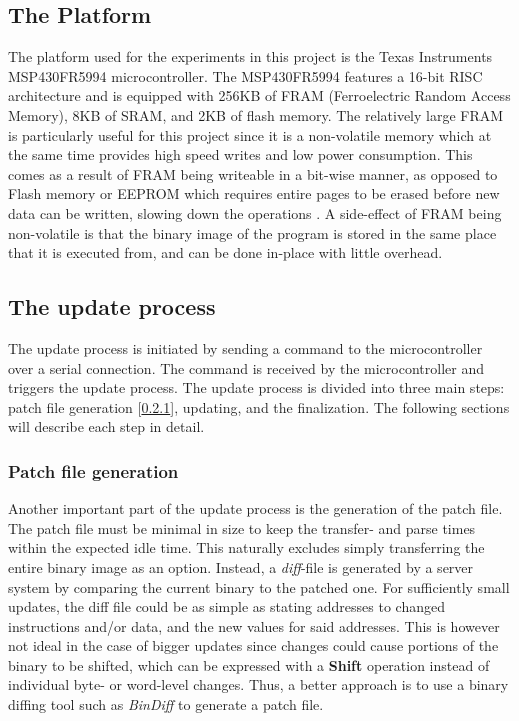 \subsection{The Platform}
The platform used for the experiments in this project is the Texas Instruments MSP430FR5994 microcontroller. The MSP430FR5994 features a 16-bit RISC architecture and is equipped with 256KB of FRAM (Ferroelectric Random Access Memory), 8KB of SRAM, and 2KB of flash memory. The relatively large FRAM is particularly useful for this project since it is a non-volatile memory which at the same time provides high speed writes and low power consumption. This comes as a result of FRAM being writeable in a bit-wise manner, as opposed to Flash memory or EEPROM which requires entire pages to be erased before new data can be written, slowing down the operations \cite{framReport}. A side-effect of FRAM being non-volatile is that the binary image of the program is stored in the same place that it is executed from, and can be done in-place with little overhead. 

\subsection{The update process}
The update process is initiated by sending a command to the microcontroller over a serial connection. The command is received by the microcontroller and triggers the update process. The update process is divided into three main steps: patch file generation [\ref{sec:patchfile}], updating, and the finalization. The following sections will describe each step in detail.

\subsubsection{Patch file generation}\label{sec:patchfile}
Another important part of the update process is the generation of the patch file. The patch file must be minimal in size to keep the transfer- and parse times within the expected idle time. This naturally excludes simply transferring the entire binary image as an option. Instead, a \textit{diff}-file is generated by a server system by comparing the current binary to the patched one. For sufficiently small updates, the diff file could be as simple as stating addresses to changed instructions and/or data, and the new values for said addresses. This is however not ideal in the case of bigger updates since changes could cause portions of the binary to be shifted, which can be expressed with a \textbf{Shift} operation instead of individual byte- or word-level changes. Thus, a better approach is to use a binary diffing tool such as \textit{BinDiff} to generate a patch file.



